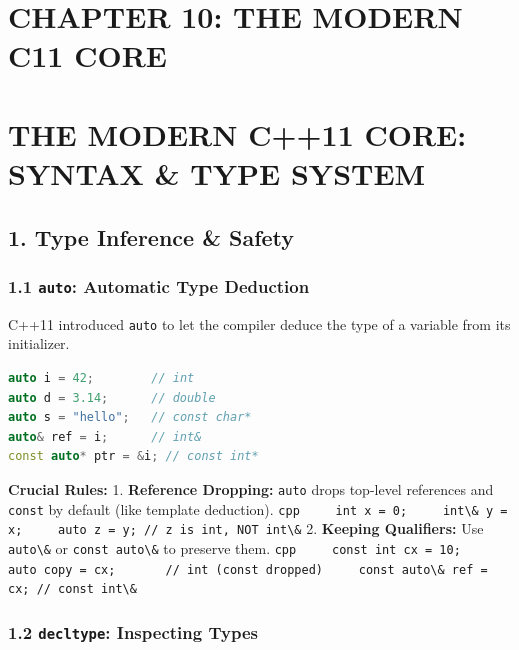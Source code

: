 \hypertarget{chapter-10-the-modern-c11-core}{%
\section{CHAPTER 10: THE MODERN C11
CORE}\label{chapter-10-the-modern-c11-core}}

\hypertarget{the-modern-c11-core-syntax-type-system}{%
\section{THE MODERN C++11 CORE: SYNTAX \& TYPE
SYSTEM}\label{the-modern-c11-core-syntax-type-system}}

\hypertarget{type-inference-safety}{%
\subsection{1. Type Inference \& Safety}\label{type-inference-safety}}

\hypertarget{auto-automatic-type-deduction}{%
\subsubsection{\texorpdfstring{1.1 \texttt{auto}: Automatic Type
Deduction}{1.1 auto: Automatic Type Deduction}}\label{auto-automatic-type-deduction}}

C++11 introduced \passthrough{\lstinline!auto!} to let the compiler
deduce the type of a variable from its initializer.

\begin{lstlisting}[language={C++}]
auto i = 42;        // int
auto d = 3.14;      // double
auto s = "hello";   // const char*
auto& ref = i;      // int&
const auto* ptr = &i; // const int*
\end{lstlisting}

\textbf{Crucial Rules:} 1. \textbf{Reference Dropping:}
\passthrough{\lstinline!auto!} drops top-level references and
\passthrough{\lstinline!const!} by default (like template deduction).
\passthrough{\lstinline!cpp     int x = 0;     int\& y = x;     auto z = y; // z is int, NOT int\&!}
2. \textbf{Keeping Qualifiers:} Use \passthrough{\lstinline!auto\&!} or
\passthrough{\lstinline!const auto\&!} to preserve them.
\passthrough{\lstinline!cpp     const int cx = 10;     auto copy = cx;       // int (const dropped)     const auto\& ref = cx; // const int\&!}

\hypertarget{decltype-inspecting-types}{%
\subsubsection{\texorpdfstring{1.2 \texttt{decltype}: Inspecting
Types}{1.2 decltype: Inspecting Types}}\label{decltype-inspecting-types}}

